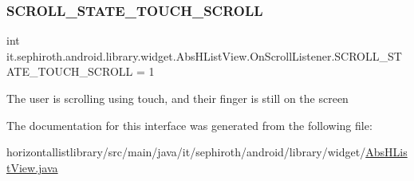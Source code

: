 \subsubsection{\texorpdfstring{S\+C\+R\+O\+L\+L\+\_\+\+S\+T\+A\+T\+E\+\_\+\+T\+O\+U\+C\+H\+\_\+\+S\+C\+R\+O\+LL}{SCROLL\_STATE\_TOUCH\_SCROLL}}
{\footnotesize\ttfamily int it.\+sephiroth.\+android.\+library.\+widget.\+Abs\+H\+List\+View.\+On\+Scroll\+Listener.\+S\+C\+R\+O\+L\+L\+\_\+\+S\+T\+A\+T\+E\+\_\+\+T\+O\+U\+C\+H\+\_\+\+S\+C\+R\+O\+LL = 1\hspace{0.3cm}{\ttfamily [static]}}

The user is scrolling using touch, and their finger is still on the screen 

The documentation for this interface was generated from the following file\+:\begin{DoxyCompactItemize}
\item 
horizontallistlibrary/src/main/java/it/sephiroth/android/library/widget/\hyperlink{_abs_h_list_view_8java}{Abs\+H\+List\+View.\+java}\end{DoxyCompactItemize}
